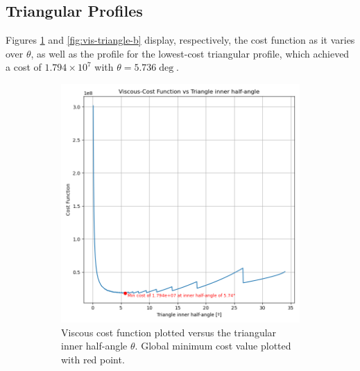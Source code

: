\documentclass[11pt]{article}
\begin{document}
\subsection{Triangular Profiles}
Figures \ref{fig:vis-triangle-a} and \ref{fig:vis-triangle-b} display, respectively, the cost function as it varies over $\theta$, as well as the profile for the lowest-cost triangular profile, which achieved a cost of $1.794 \times 10^7$ with $\theta=5.736\deg$.
\begin{figure}[H]
\centering
\begin{subfigure}[b]{0.45\textwidth}
    \centering
    \includegraphics[width=\linewidth]{../results/viscous/triangles.png}
    \caption{Viscous cost function plotted versus the triangular inner half-angle $\theta$. Global minimum cost value plotted with red point.}
    \label{fig:vis-triangle-a}
\end{subfigure}
\hfill
\begin{subfigure}[b]{0.45\textwidth}
    \centering

\end{subfigure}
\end{figure}
\end{document}
